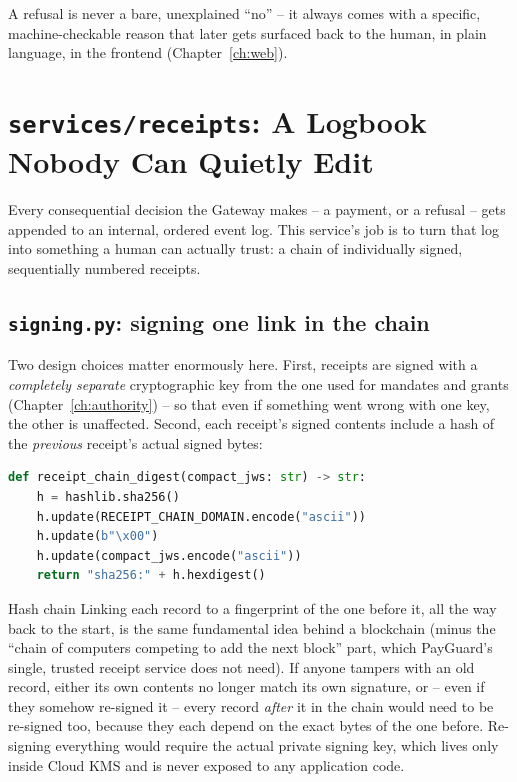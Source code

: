 \documentclass[11pt]{report}
\newcommand{\file}[1]{\texttt{#1}}
\begin{document}
\noindent A refusal is never a bare, unexplained ``no'' -- it always comes
with a specific, machine-checkable reason that later gets surfaced back
to the human, in plain language, in the frontend (Chapter~\ref{ch:web}).

\chapter{\file{services/receipts}: A Logbook Nobody Can Quietly Edit}
\label{ch:receipts}

Every consequential decision the Gateway makes -- a payment, or a
refusal -- gets appended to an internal, ordered event log. This
service's job is to turn that log into something a human can actually
trust: a chain of individually signed, sequentially numbered receipts.

\section{\file{signing.py}: signing one link in the chain}

Two design choices matter enormously here. First, receipts are signed
with a \emph{completely separate} cryptographic key from the one used for
mandates and grants (Chapter~\ref{ch:authority}) -- so that even if
something went wrong with one key, the other is unaffected. Second, each
receipt's signed contents include a hash of the \emph{previous} receipt's
actual signed bytes:

\begin{lstlisting}[language=Python]
def receipt_chain_digest(compact_jws: str) -> str:
    h = hashlib.sha256()
    h.update(RECEIPT_CHAIN_DOMAIN.encode("ascii"))
    h.update(b"\x00")
    h.update(compact_jws.encode("ascii"))
    return "sha256:" + h.hexdigest()
\end{lstlisting}

\begin{concept}{Hash chain}
Linking each record to a fingerprint of the one before it, all the way
back to the start, is the same fundamental idea behind a blockchain
(minus the ``chain of computers competing to add the next block'' part,
which PayGuard's single, trusted receipt service does not need). If
anyone tampers with an old record, either its own contents no longer
match its own signature, or -- even if they somehow re-signed it -- every
record \emph{after} it in the chain would need to be re-signed too,
because they each depend on the exact bytes of the one before.
Re-signing everything would require the actual private signing key,
which lives only inside Cloud KMS and is never exposed to any
application code.
\end{concept}
\end{document}
